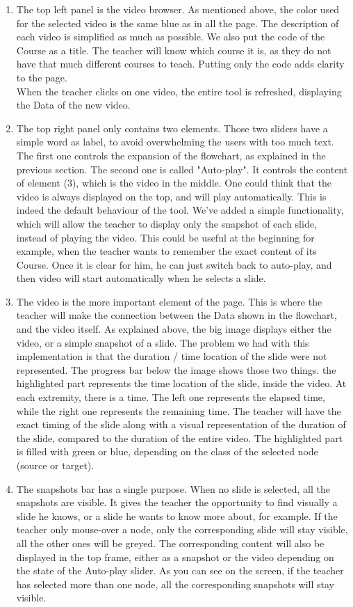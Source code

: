 \documentclass[11pt,a4paper]{article}
\begin{document}
\begin{enumerate}
    \item The top left panel is the video browser. As mentioned above, the color used for the selected video is the same blue as in all the page. The description of each video is simplified as much as possible. We also put the code of the Course as a title. The teacher will know which course it is, as they do not have that much different courses to teach. Putting only the code adds clarity to the page. \\
    When the teacher clicks on one video, the entire tool is refreshed, displaying the Data of the new video.
    \item The top right panel only contains two elements. Those two sliders have a simple word as label, to avoid overwhelming the users with too much text. The first one controls the expansion of the flowchart, as explained in the previous section. The second one is called "Auto-play". It controls the content of element (3), which is the video in the middle. One could think that the video is always displayed on the top, and will play automatically. This is indeed the default behaviour of the tool. We've added a simple functionality, which will allow the teacher to display only the snapshot of each slide, instead of playing the video. This could be useful at the beginning for example, when the teacher wants to remember the exact content of its Course. Once it is clear for him, he can just switch back to auto-play, and then video will start automatically when he selects a slide.
    \item The video is the more important element of the page. This is where the teacher will make the connection between the Data shown in the flowchart, and the video itself. As explained above, the big image displays either the video, or a simple snapshot of a slide. The problem we had with this implementation is that the duration / time location of the slide were not represented. The progress bar below the image shows those two things. the highlighted part represents the time location of the slide, inside the video. At each extremity, there is a time. The left one represents the elapsed time, while the right one represents the remaining time. The teacher will have the exact timing of the slide along with a visual representation of the duration of the slide, compared to the duration of the entire video. The highlighted part is filled with green or blue, depending on the class of the selected node (source or target).
    \item The snapshots bar has a single purpose. When no slide is selected, all the snapshots are visible. It gives the teacher the opportunity to find visually a slide he knows, or a slide he wants to know more about, for example. If the teacher only mouse-over a node, only the corresponding slide will stay visible, all the other ones will be greyed. The corresponding content will also be displayed in the top frame, either as a snapshot or the video depending on the state of the Auto-play slider. As you can see on the screen, if the teacher has selected more than one node, all the corresponding snapshots will stay visible.

\end{enumerate}
\end{document}
